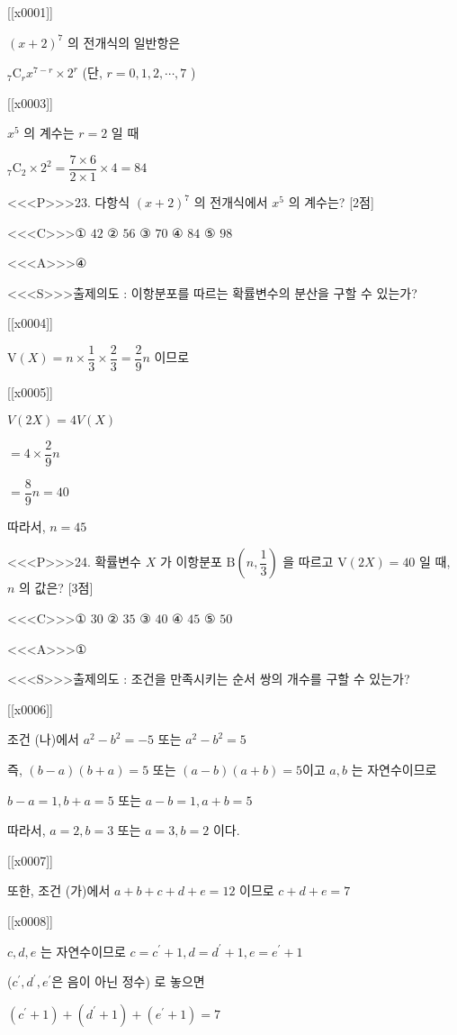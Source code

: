 \documentclass{oblivoir}
\begin{document}
[[x0001]]

$(x+2)^{7}$ 의 전개식의 일반항은

${ }_{7} \mathrm{C}_{r} x^{7-r} \times 2^{r}$ (단, $r=0,1,2, \cdots, 7$ )

[[x0003]]

$x^{5}$ 의 계수는 $r=2$ 일 때

${ }_{7} \mathrm{C}_{2} \times 2^{2}=\dfrac{7 \times 6}{2 \times 1} \times 4=84$


<<<P>>>23. 다항식 $(x+2)^{7}$ 의 전개식에서 $x^{5}$ 의 계수는? [2점]

<<<C>>>① $42$
② $56$
③ $70$
④ $84$
⑤ $98$


<<<A>>>④

<<<S>>>출제의도 : 이항분포를 따르는 확률변수의 분산을 구할 수 있는가?

[[x0004]]

$\mathrm{V}(X)=n \times \dfrac{1}{3} \times \dfrac{2}{3}=\dfrac{2}{9} n$
이므로

[[x0005]]

$V(2 X)=4 V(X)$

$=4 \times \dfrac{2}{9} n$

$=\dfrac{8}{9} n=40$

따라서, $n=45$


<<<P>>>24. 확률변수 $X$ 가 이항분포 $\mathrm{B}\left(n, \dfrac{1}{3}\right)$ 을 따르고 $\mathrm{V}(2 X)=40$ 일 때, $n$ 의 값은? [3점]

<<<C>>>① $30$
② $35$
③ $40$
④ $45$
⑤ $50$


<<<A>>>①

<<<S>>>출제의도 : 조건을 만족시키는 순서 쌍의 개수를 구할 수 있는가?

[[x0006]]

조건 (나)에서
$a^{2}-b^{2}=-5$ 또는 $a^{2}-b^{2}=5$

즉, $(b-a)(b+a)=5$ 또는 $(a-b)(a+b)=5$이고 $a, b$ 는 자연수이므로

$b-a=1, b+a=5$ 또는 $a-b=1, a+b=5$

따라서, $a=2, b=3$ 또는 $a=3, b=2$ 이다.

[[x0007]]

또한, 조건 (가)에서 $a+b+c+d+e=12$ 이므로 $c+d+e=7$

[[x0008]]

$c, d, e$ 는 자연수이므로
$c=c^{\prime}+1, d=d^{\prime}+1, e=e^{\prime}+1$

($c^{\prime}, d^{\prime}, e^{\prime}$은 음이 아닌 정수) 로 놓으면

$\left(c^{\prime}+1\right)+\left(d^{\prime}+1\right)+\left(e^{\prime}+1\right)=7$
\end{document}
